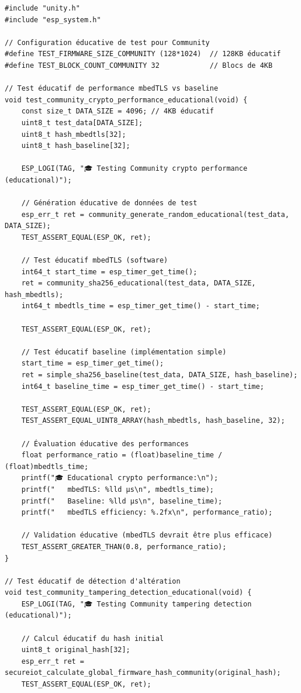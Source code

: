 \begin{lstlisting}[caption={Framework de test éducatif Community}]
#include "unity.h"
#include "esp_system.h"

// Configuration éducative de test pour Community
#define TEST_FIRMWARE_SIZE_COMMUNITY (128*1024)  // 128KB éducatif
#define TEST_BLOCK_COUNT_COMMUNITY 32            // Blocs de 4KB

// Test éducatif de performance mbedTLS vs baseline
void test_community_crypto_performance_educational(void) {
    const size_t DATA_SIZE = 4096; // 4KB éducatif
    uint8_t test_data[DATA_SIZE];
    uint8_t hash_mbedtls[32];
    uint8_t hash_baseline[32];
    
    ESP_LOGI(TAG, "🎓 Testing Community crypto performance (educational)");
    
    // Génération éducative de données de test
    esp_err_t ret = community_generate_random_educational(test_data, DATA_SIZE);
    TEST_ASSERT_EQUAL(ESP_OK, ret);
    
    // Test éducatif mbedTLS (software)
    int64_t start_time = esp_timer_get_time();
    ret = community_sha256_educational(test_data, DATA_SIZE, hash_mbedtls);
    int64_t mbedtls_time = esp_timer_get_time() - start_time;
    
    TEST_ASSERT_EQUAL(ESP_OK, ret);
    
    // Test éducatif baseline (implémentation simple)
    start_time = esp_timer_get_time();
    ret = simple_sha256_baseline(test_data, DATA_SIZE, hash_baseline);
    int64_t baseline_time = esp_timer_get_time() - start_time;
    
    TEST_ASSERT_EQUAL(ESP_OK, ret);
    TEST_ASSERT_EQUAL_UINT8_ARRAY(hash_mbedtls, hash_baseline, 32);
    
    // Évaluation éducative des performances
    float performance_ratio = (float)baseline_time / (float)mbedtls_time;
    printf("🎓 Educational crypto performance:\n");
    printf("   mbedTLS: %lld µs\n", mbedtls_time);
    printf("   Baseline: %lld µs\n", baseline_time);
    printf("   mbedTLS efficiency: %.2fx\n", performance_ratio);
    
    // Validation éducative (mbedTLS devrait être plus efficace)
    TEST_ASSERT_GREATER_THAN(0.8, performance_ratio);
}

// Test éducatif de détection d'altération
void test_community_tampering_detection_educational(void) {
    ESP_LOGI(TAG, "🎓 Testing Community tampering detection (educational)");
    
    // Calcul éducatif du hash initial
    uint8_t original_hash[32];
    esp_err_t ret = secureiot_calculate_global_firmware_hash_community(original_hash);
    TEST_ASSERT_EQUAL(ESP_OK, ret);
    

\end{lstlisting}
